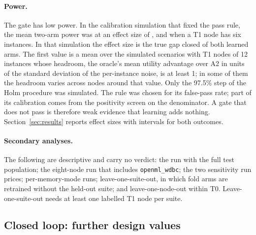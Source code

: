\paragraph{Power.}
The gate has low power. In the calibration simulation that fixed the pass rule, the mean two-arm power was \GatePowerMain{} at an effect size of \GatePowerEffect{}, and \GatePowerSmallTOne{} when a T1 node has six instances.
In that simulation the effect size is the true gap closed of both learned arms. The first value is a mean over the simulated scenarios with T1 nodes of 12 instances whose headroom, the oracle's mean utility advantage over A2 in units of the standard deviation of the per-instance noise, is at least 1; in some of them the headroom varies across nodes around that value. Only the 97.5\% step of the Holm procedure was simulated. The rule was chosen for its false-pass rate; part of its calibration comes from the positivity screen on the denominator. A gate that does not pass is therefore weak evidence that learning adds nothing. Section~\ref{sec:results} reports effect sizes with intervals for both outcomes.

\paragraph{Secondary analyses.}
The following are descriptive and carry no verdict: the run with the full test population; the eight-node run that includes \texttt{openml\_wdbc}; the two sensitivity run prices; per-memory-mode runs; leave-one-suite-out, in which fold arms are retrained without the held-out suite; and leave-one-node-out within T0. Leave-one-suite-out needs at least one labelled T1 node per suite.

\subsection{Closed loop: further design values}
\label{app:closed}


